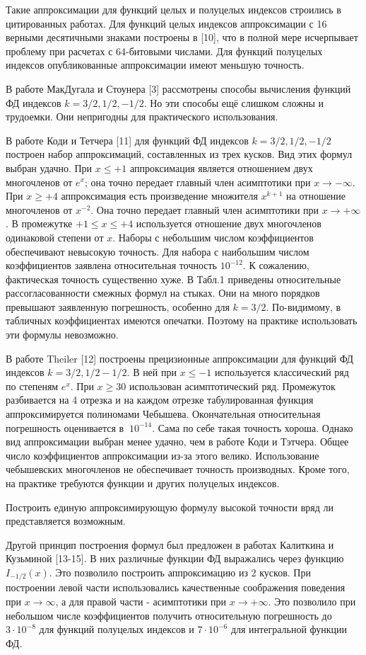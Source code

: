 Такие аппроксимации для функций целых и полуцелых индексов
строились в цитированных работах. Для функций целых индексов
аппроксимации с 16 верными десятичными знаками построены в [10], что в
полной мере исчерпывает проблему при расчетах с 64-битовыми
числами. Для функций полуцелых индексов опубликованные
аппроксимации имеют меньшую точность. 

В работе МакДугала и Стоунера [3] рассмотрены способы вычисления функций ФД индексов $k =3/2, 1/2, -1/2$. Но эти способы ещё слишком сложны и трудоемки. Они непригодны для практического использования.


В работе Коди и Тетчера [11] для функций ФД индексов $k =3/2, 1/2, -1/2$ построен набор аппроксимаций, составленных из трех кусков. Вид этих формул выбран удачно. При $x \leqslant +1$ аппроксимация является отношением двух многочленов от $e^x$; она точно передает главный член асимптотики при $x \to -\infty$. При $x \geqslant +4$ аппроксимация есть произведение множителя $x^{k+1}$ на отношение многочленов от $x^{-2}$. Она точно передает главный член асимптотики при $x \to +\infty$. В промежутке $+1 \leqslant x \leqslant +4$ используется отношение двух многочленов одинаковой степени от $x$. Наборы с небольшим числом коэффициентов обеспечивают невысокую точность. Для набора с наибольшим числом коэффициентов заявлена относительная точность $10^{-12}$. К сожалению, фактическая точность существенно хуже. В Табл.1 приведены относительные рассогласованности смежных формул на стыках. Они на много порядков превышают заявленную погрешность, особенно для $k = 3/2$. По-видимому, в табличных коэффициентах имеются опечатки. Поэтому на практике использовать эти формулы невозможно. 

В работе Theiler [12] построены прецизионные аппроксимации для функций ФД индексов $k = 3/2, 1/2 -1/2$. В ней при $x \leqslant -1$ используется классический ряд по степеням $e^x$. При $x \geqslant 30$ использован асимптотический ряд. Промежуток разбивается на 4 отрезка и на каждом отрезке табулированная функция аппроксимируется полиномами Чебышева. Окончательная относительная погрешность оценивается в $~10^{-14}$. Сама по себе такая точность хороша. Однако вид аппроксимации выбран менее удачно, чем в работе Коди и Тэтчера. Общее число коэффициентов аппроксимации из-за этого велико. Использование чебышевских многочленов не обеспечивает точность производных. Кроме того, на практике требуются функции и других полуцелых индексов.

Построить единую аппроксимирующую формулу высокой точности
вряд ли представляется возможным. 

Другой принцип построения формул был предложен в работах Калиткина и Кузьминой [13-15]. В них различные функции ФД выражались через функцию $I_{-1/2}(x)$. Это позволило построить аппроксимацию из 2 кусков. При построении левой части использовались качественные соображения поведения при $x \to \infty$, а для правой части - асимптотики при $x \to +\infty$. Это позволило при небольшом числе коэффициентов получить относительную погрешность до $3·10^{-8}$ для функций полуцелых индексов и $7·10^{-6}$ для интегральной функции ФД.

